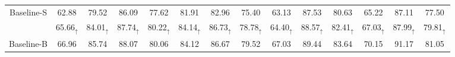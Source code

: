 \documentclass[journal]{IEEEtran}
\begin{document}
\begin{table*}[htp]
{\begin{tabular}{cccccccccccccc}
Baseline-S                          & \multicolumn{1}{c}{62.88} & \multicolumn{1}{c}{79.52}                  & \multicolumn{1}{c}{86.09} & \multicolumn{1}{c}{77.62}                  & \multicolumn{1}{c}{81.91}                  & \multicolumn{1}{c}{82.96}                  & \multicolumn{1}{c}{75.40} & \multicolumn{1}{c}{63.13}                  & \multicolumn{1}{c}{87.53}                  & \multicolumn{1}{c}{80.63}                  & \multicolumn{1}{c}{65.22}                 & \multicolumn{1}{c}{87.11}                  & \multicolumn{1}{c}{77.50}                  \\
\rowcolor[gray]{0.9}\multicolumn{1}{c}{+Ours} & \multicolumn{1}{c}{65.66$_\uparrow$} & \multicolumn{1}{c}{84.01$_\uparrow$}                  & \multicolumn{1}{c}{87.74$_\uparrow$} & \multicolumn{1}{c}{80.22$_\uparrow$}                  & \multicolumn{1}{c}{84.14$_\uparrow$}                  & \multicolumn{1}{c}{86.73$_\uparrow$}                  & \multicolumn{1}{c}{78.78$_\uparrow$} & \multicolumn{1}{c}{64.40$_\uparrow$}                  & \multicolumn{1}{c}{88.57$_\uparrow$}                  & \multicolumn{1}{c}{82.41$_\uparrow$}                  & \multicolumn{1}{c}{67.03$_\uparrow$}                 & \multicolumn{1}{c}{87.99$_\uparrow$}                  & \multicolumn{1}{c}{79.81$_\uparrow$}                  \\ \hline
Baseline-B                          & \multicolumn{1}{c}{66.96} & \multicolumn{1}{c}{85.74}                  & \multicolumn{1}{c}{88.07} & \multicolumn{1}{c}{80.06}                  & \multicolumn{1}{c}{84.12}                  & \multicolumn{1}{c}{86.67}                  & \multicolumn{1}{c}{79.52} & \multicolumn{1}{c}{67.03}                  & \multicolumn{1}{c}{89.44}                  & \multicolumn{1}{c}{83.64}                  & \multicolumn{1}{c}{70.15}                 & \multicolumn{1}{c}{91.17}                  & \multicolumn{1}{c}{81.05}                  \\



\end{tabular}}
\end{table*}
\end{document}
